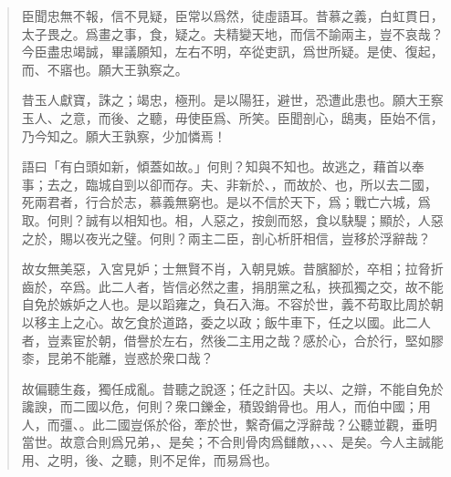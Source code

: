 \begin{quotation}
臣聞忠無不報，信不見疑，臣常以爲然，徒虛語耳。昔慕之義，白虹貫日，太子畏之。爲畫之事，食，疑之。夫精變天地，而信不諭兩主，豈不哀哉？今臣盡忠竭誠，畢議願知，左右不明，卒從吏訊，爲世所疑。是使、復起，而、不寤也。願大王孰察之。

昔玉人獻寶，誅之；竭忠，極刑。是以陽狂，避世，恐遭此患也。願大王察玉人、之意，而後、之聽，毋使臣爲、所笑。臣聞剖心，鴟夷，臣始不信，乃今知之。願大王孰察，少加憐焉！

語曰「有白頭如新，傾蓋如故。」何則？知與不知也。故逃之，藉首以奉事；去之，臨城自剄以卻而存。夫、非新於、，而故於、也，所以去二國，死兩君者，行合於志，慕義無窮也。是以不信於天下，爲；戰亡六城，爲取。何則？誠有以相知也。相，人惡之，按劍而怒，食以駃騠；顯於，人惡之於，賜以夜光之璧。何則？兩主二臣，剖心析肝相信，豈移於浮辭哉？

故女無美惡，入宮見妒；士無賢不肖，入朝見嫉。昔臏腳於，卒相；拉脅折齒於，卒爲。此二人者，皆信必然之畫，捐朋黨之私，挾孤獨之交，故不能自免於嫉妒之人也。是以蹈雍之，負石入海。不容於世，義不苟取比周於朝以移主上之心。故乞食於道路，委之以政；飯牛車下，任之以國。此二人者，豈素宦於朝，借譽於左右，然後二主用之哉？感於心，合於行，堅如膠桼，昆弟不能離，豈惑於衆口哉？

故偏聽生姦，獨任成亂。昔聽之說逐；任之計囚。夫以、之辯，不能自免於讒諛，而二國以危，何則？衆口鑠金，積毀銷骨也。用人，而伯中國；用人，而彊、。此二國豈係於俗，牽於世，繫奇偏之浮辭哉？公聽並觀，垂明當世。故意合則爲兄弟，、是矣；不合則骨肉爲讎敵，、、、是矣。今人主誠能用、之明，後、之聽，則不足侔，而易爲也。


\end{quotation}
